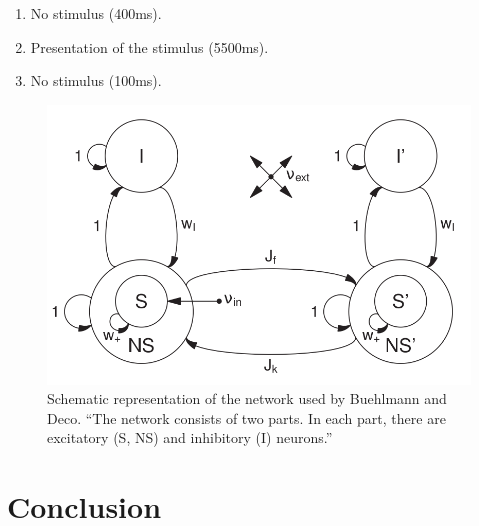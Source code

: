 \documentclass[a4paper,11pt]{article}
\begin{document}
\begin{enumerate}
\item{No stimulus (400ms).}
\item{Presentation of the stimulus (5500ms).}
\item{No stimulus (100ms)}.
\end{enumerate}

\begin{figure}[H]
\centering
\includegraphics[scale = 0.75]{Buehlmann2010_Schema}
\caption{
	Schematic representation of the network used by Buehlmann and Deco. ``The network consists of two parts. In each part, there are excitatory (S, NS) and inhibitory (I) neurons.'' \cite{Buehlmann2010}
	\label{fig:buehlmann-schema}
}
\end{figure}

\section{Conclusion}
\label{sec:conclusion}


\clearpage


{}
\clearpage
\end{document}
